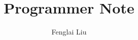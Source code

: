 \documentclass[a4paper,12pt,oneside]{book}
\author{Fenglai Liu}
\title{Programmer Note}
\begin{document}
\maketitle
\tableofcontents


\graphicspath{{figure/}}


%
%
%



\end{document}

